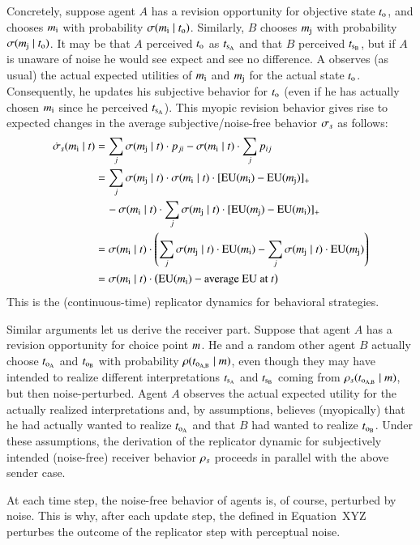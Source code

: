 \documentclass[fleqn,reqno,10pt]{article}
\newcommand{\rdd}{\acro{rdd}} %
\begin{document}
Concretely, suppose agent $A$ has a revision opportunity for objective
state $t_{\mathrm{o}}$, and chooses $m_{\mathrm{i}}$ with probability
$\sigma(m_{\mathrm{i}} \mid t_{\mathrm{o}})$. Similarly, $B$ chooses
$m_{\mathrm{j}}$ with probability $\sigma(m_{\mathrm{j}} \mid
t_{\mathrm{o}})$. It may be that $A$ perceived $t_{\mathrm{o}}$ as
$t_{\mathrm{s_A}}$ and that $B$ perceived $t_{\mathrm{s_B}}$, but if $A$ is
unaware of noise he would see expect and see no difference. A observes
(as usual) the actual expected utilities of $m_{\mathrm{i}}$ and
$m_{\mathrm{j}}$ for the actual state $t_{\mathrm{o}}$. Consequently, he
updates his subjective behavior for $t_{\mathrm{o}}$ (even if he has
actually chosen $m_{\mathrm{i}}$ since he perceived
$t_{\mathrm{s_A}}$). This myopic revision behavior gives rise to expected
changes in the average subjective/noise-free behavior $\sigma_s$ as
follows:
\begin{align*}
  \dot{\sigma}_s(m_{\mathrm{i}} \mid t) & = \sum_j
  \sigma(m_{\mathrm{j}} \mid t) \cdot p_{ji} -  
  \sigma(m_{\mathrm{i}} \mid t) \cdot \sum_j p_{ij} \\
  & = \sum_j  \sigma(m_{\mathrm{j}} \mid t) \cdot
    \sigma(m_{\mathrm{i}} \mid t) \cdot [\mathrm{EU}(m_{\mathrm{i}}) -
    \mathrm{EU}(m_{\mathrm{j}})]_+ \\ 
   & \ \ \ \  - \sigma(m_{\mathrm{i}} \mid t) \cdot \sum_j
   \sigma(m_{\mathrm{j}} \mid t) \cdot [\mathrm{EU}(m_{\mathrm{j}}) -
    \mathrm{EU}(m_{\mathrm{i}})]_+ \\
   & = \sigma(m_{\mathrm{i}} \mid t) \cdot \left ( \sum_j
     \sigma(m_{\mathrm{j}} \mid t) \cdot \mathrm{EU}(m_{\mathrm{i}}) - \sum_j
     \sigma(m_{\mathrm{j}} \mid t) \cdot \mathrm{EU}(m_{\mathrm{j}})
   \right ) \\
   & = \sigma(m_{\mathrm{i}} \mid t) \cdot \left (
     \mathrm{EU}(m_{\mathrm{i}}) - \text{average EU at $t$} \right )
\end{align*}
This is the (continuous-time) replicator dynamics for behavioral
strategies.

Similar arguments let us derive the receiver part. Suppose that agent
$A$ has a revision opportunity for choice point $m$. He and a
random other agent $B$ actually choose $t_{\mathrm{o_A}}$ and
$t_{\mathrm{o_B}}$ with probability $\rho(t_{\mathrm{o_{A,B}}} \mid
m)$, even though they may have intended to realize different
interpretations $t_{\mathrm{s_A}}$ and $t_{\mathrm{s_B}}$ coming from
$\rho_s(t_{\mathrm{o_{A,B}}} \mid m)$, but then
noise-perturbed. Agent $A$ observes the actual expected utility for
the actually realized interpretations and, by assumptions, believes
(myopically) that he had actually wanted to realize $t_{\mathrm{o_A}}$
and that $B$ had wanted to realize $t_{\mathrm{o_B}}$. Under these
assumptions, the derivation of the replicator dynamic for subjectively
intended (noise-free) receiver behavior $\rho_s$ proceeds in
parallel with the above sender case.

At each time step, the noise-free behavior of agents is, of course,
perturbed by noise. This is why, after each update step, the \rdd
defined in Equation~XYZ perturbes the outcome of the replicator step
with perceptual noise.



\printbibliography[heading=bibintoc]
\end{document}
